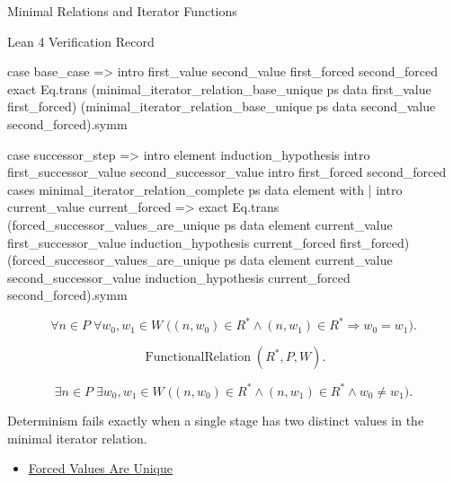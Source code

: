 \begin{topicbox}{Minimal Relations and Iterator Functions}
\begin{formalizationrecord}{Lean 4 Verification Record}
\begin{leancode}
  case base_case =>
    intro first_value second_value first_forced second_forced
    exact
      Eq.trans
        (minimal_iterator_relation_base_unique ps data first_value first_forced)
        (minimal_iterator_relation_base_unique ps data second_value second_forced).symm

  case successor_step =>
    intro element induction_hypothesis
    intro first_successor_value second_successor_value
    intro first_forced second_forced
    cases minimal_iterator_relation_complete ps data element with
    | intro current_value current_forced =>
        exact
          Eq.trans
            (forced_successor_values_are_unique
              ps data element current_value first_successor_value
              induction_hypothesis current_forced first_forced)
            (forced_successor_values_are_unique
              ps data element current_value second_successor_value
              induction_hypothesis current_forced second_forced).symm
\end{leancode}
\end{formalizationrecord}

\begin{remark*}
\[
\forall n\in P\;\forall w_0,w_1\in W\;
\bigl((n,w_0)\in R^*\land (n,w_1)\in R^*\Longrightarrow w_0=w_1\bigr).
\]
\end{remark*}

\begin{remark*}
\[
\operatorname{FunctionalRelation}(R^*,P,W).
\]
\end{remark*}

\begin{remark*}
\[
\exists n\in P\;\exists w_0,w_1\in W\;
\bigl((n,w_0)\in R^*\land (n,w_1)\in R^*\land w_0\neq w_1\bigr).
\]
\end{remark*}

\begin{remark*}
Determinism fails exactly when a single stage has two distinct values in the
minimal iterator relation.
\end{remark*}

\begin{dependencies}
\begin{itemize}
  \item \hyperref[lem:forced-values-are-unique]{Forced Values Are Unique}
\end{itemize}
\end{dependencies}


\end{topicbox}
